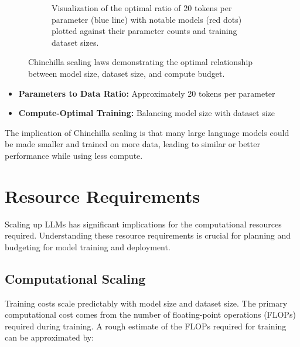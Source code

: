 \begin{figure}[ht]
\begin{subfigure}[b]{0.52\textwidth}
        \caption{Visualization of the optimal ratio of 20 tokens per parameter (blue line) with notable models (red dots) plotted against their parameter counts and training dataset sizes.}
        \label{fig:chinchilla_scaling_plot}
    \end{subfigure}
    \caption{Chinchilla scaling laws demonstrating the optimal relationship between model size, dataset size, and compute budget.}
    \label{fig:chinchilla_combined}
\end{figure}


\begin{itemize}
    \item \textbf{Parameters to Data Ratio:} Approximately 20 tokens per parameter
    \item \textbf{Compute-Optimal Training:} Balancing model size with dataset size
\end{itemize}

The implication of Chinchilla scaling is that many large language models could be made smaller and trained on more data, leading to similar or better performance while using less compute.

\section{Resource Requirements}
\label{sec:resource_requirements}

Scaling up LLMs has significant implications for the computational resources required. Understanding these resource requirements is crucial for planning and budgeting for model training and deployment.

\subsection{Computational Scaling}
\noindent
Training costs scale predictably with model size and dataset size. The primary computational cost comes from the number of floating-point operations (FLOPs) required during training. A rough estimate of the FLOPs required for training can be approximated by:

